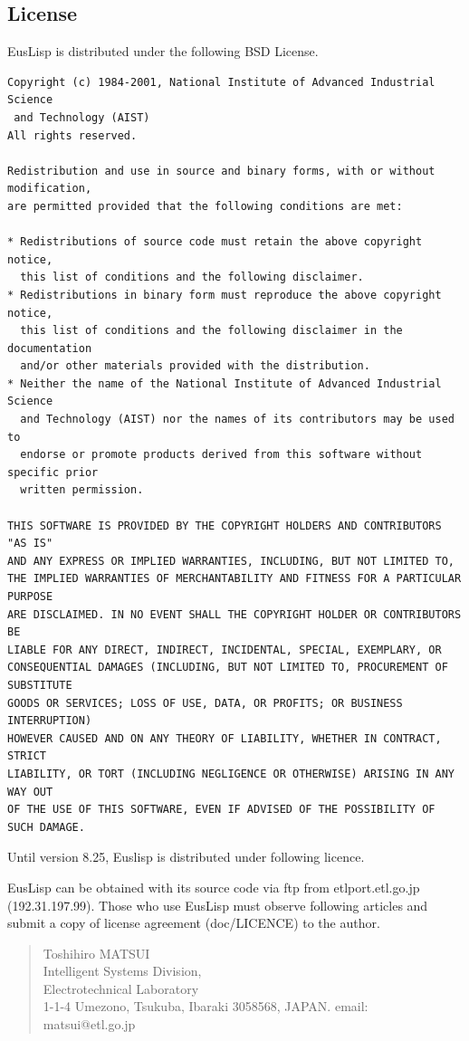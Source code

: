 \subsection{\label{License}License}

EusLisp is distributed under the following BSD License.

\begin{verbatim}
Copyright (c) 1984-2001, National Institute of Advanced Industrial Science
 and Technology (AIST)
All rights reserved.

Redistribution and use in source and binary forms, with or without modification,
are permitted provided that the following conditions are met:

* Redistributions of source code must retain the above copyright notice,
  this list of conditions and the following disclaimer.
* Redistributions in binary form must reproduce the above copyright notice,
  this list of conditions and the following disclaimer in the documentation
  and/or other materials provided with the distribution.
* Neither the name of the National Institute of Advanced Industrial Science
  and Technology (AIST) nor the names of its contributors may be used to 
  endorse or promote products derived from this software without specific prior 
  written permission.

THIS SOFTWARE IS PROVIDED BY THE COPYRIGHT HOLDERS AND CONTRIBUTORS "AS IS" 
AND ANY EXPRESS OR IMPLIED WARRANTIES, INCLUDING, BUT NOT LIMITED TO, 
THE IMPLIED WARRANTIES OF MERCHANTABILITY AND FITNESS FOR A PARTICULAR PURPOSE 
ARE DISCLAIMED. IN NO EVENT SHALL THE COPYRIGHT HOLDER OR CONTRIBUTORS BE 
LIABLE FOR ANY DIRECT, INDIRECT, INCIDENTAL, SPECIAL, EXEMPLARY, OR 
CONSEQUENTIAL DAMAGES (INCLUDING, BUT NOT LIMITED TO, PROCUREMENT OF SUBSTITUTE 
GOODS OR SERVICES; LOSS OF USE, DATA, OR PROFITS; OR BUSINESS INTERRUPTION) 
HOWEVER CAUSED AND ON ANY THEORY OF LIABILITY, WHETHER IN CONTRACT, STRICT 
LIABILITY, OR TORT (INCLUDING NEGLIGENCE OR OTHERWISE) ARISING IN ANY WAY OUT 
OF THE USE OF THIS SOFTWARE, EVEN IF ADVISED OF THE POSSIBILITY OF SUCH DAMAGE.
\end{verbatim}

Until version 8.25, Euslisp is distributed under following licence.

EusLisp can be obtained with its source code via ftp from
etlport.etl.go.jp (192.31.197.99).
Those who use EusLisp must observe  following articles
and submit a copy of license agreement (doc/LICENCE) to the author.
\begin{quote}
\begin{tabbing}
Toshihiro MATSUI \hspace{50mm} \= \\
Intelligent Systems Division, \>  \\
Electrotechnical Laboratory  \>  \\
1-1-4 Umezono,
Tsukuba, Ibaraki 3058568, JAPAN. \> email: matsui@etl.go.jp \\
\end{tabbing}
\end{quote}

